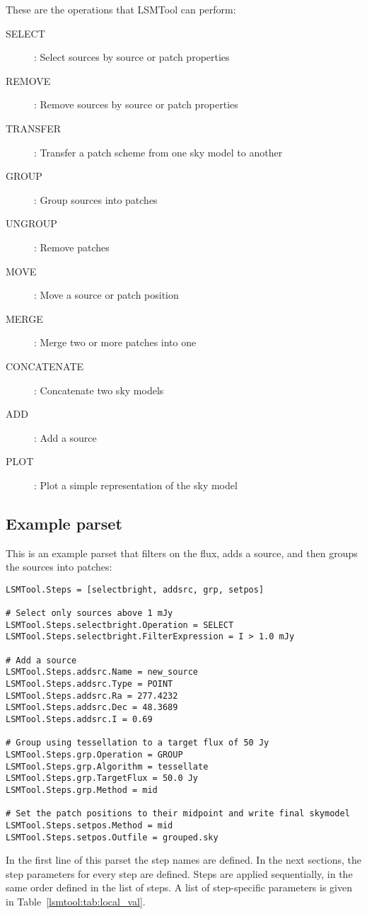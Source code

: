\documentclass[structabstract]{article}
\begin{document}
These are the operations that LSMTool can perform:
\begin{description}
 \item[SELECT]: Select sources by source or patch properties
 \item[REMOVE]: Remove sources by source or patch properties
 \item[TRANSFER]: Transfer a patch scheme from one sky model to another
 \item[GROUP]: Group sources into patches
 \item[UNGROUP]: Remove patches
 \item[MOVE]: Move a source or patch position
 \item[MERGE]: Merge two or more patches into one
 \item[CONCATENATE]: Concatenate two sky models
 \item[ADD]: Add a source
 \item[PLOT]: Plot a simple representation of the sky model
\end{description}


\subsection{Example parset}
\label{lsmtool:parset}

This is an example parset that filters on the flux, adds a source, and then groups the sources into patches:
\begin{verbatim}
LSMTool.Steps = [selectbright, addsrc, grp, setpos]

# Select only sources above 1 mJy
LSMTool.Steps.selectbright.Operation = SELECT
LSMTool.Steps.selectbright.FilterExpression = I > 1.0 mJy

# Add a source
LSMTool.Steps.addsrc.Name = new_source
LSMTool.Steps.addsrc.Type = POINT
LSMTool.Steps.addsrc.Ra = 277.4232
LSMTool.Steps.addsrc.Dec = 48.3689
LSMTool.Steps.addsrc.I = 0.69

# Group using tessellation to a target flux of 50 Jy
LSMTool.Steps.grp.Operation = GROUP
LSMTool.Steps.grp.Algorithm = tessellate
LSMTool.Steps.grp.TargetFlux = 50.0 Jy
LSMTool.Steps.grp.Method = mid

# Set the patch positions to their midpoint and write final skymodel
LSMTool.Steps.setpos.Method = mid
LSMTool.Steps.setpos.Outfile = grouped.sky
\end{verbatim}

In the first line of this parset the step names are defined. In the next sections, the
step parameters for every step are defined. Steps are applied sequentially, in the same order defined in the list of steps. A list of step-specific parameters is given in Table~\ref{lsmtool:tab:local_val}.
\end{document}
